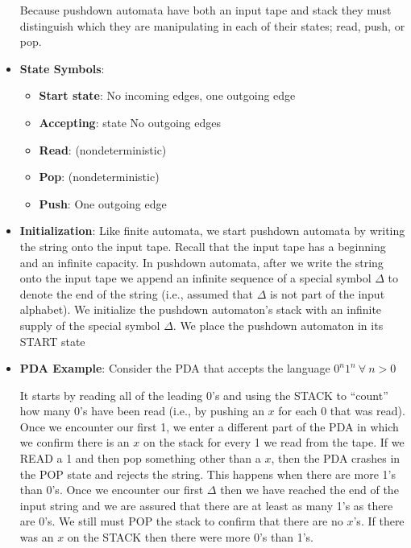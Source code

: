 \documentclass{report}
\begin{document}
\begin{itemize}
            \bigbreak \noindent 
            Because pushdown automata have both an input tape and stack they must distinguish which they are manipulating in each of their states; read, push, or pop.
            \pagebreak 
        \item \textbf{State Symbols}:
            \begin{itemize}
                \item \textbf{Start state}: No incoming edges, one outgoing edge
                \item \textbf{Accepting}: state No outgoing edges
                \item \textbf{Read}: (nondeterministic)
                \item \textbf{Pop}: (nondeterministic)
                \item \textbf{Push}: One outgoing edge
            \end{itemize}
            \bigbreak \noindent 
            \begin{figure}[ht]
                \centering
                \label{fig:pda1}
            \end{figure}
\item \textbf{Initialization}: Like finite automata, we start pushdown automata by writing the string onto the input tape. Recall that the input tape has a beginning and an infinite capacity.
    \bigbreak \noindent 
    In pushdown automata, after we write the string onto the input tape we append an infinite sequence of a special symbol $\Delta$ to denote the end of the string (i.e., assumed that $\Delta$ is not part of the input alphabet).
    \bigbreak \noindent 
    We initialize the pushdown automaton’s stack with an infinite supply of the special symbol $\Delta$.
    \bigbreak \noindent 
    We place the pushdown automaton in its START state
    \pagebreak 
\item \textbf{PDA Example}: Consider the PDA that accepts the language $0^{n}1^{n} \ \forall \ n >0 $
    \bigbreak \noindent 
    \begin{figure}[ht]
        \centering
        \label{fig:pda2}
    \end{figure}
    \bigbreak \noindent 
    It starts by reading all of the leading 0's and using the STACK to ``count'' how many 0's have been read (i.e., by pushing an $x$ for each 0 that was read).
    \bigbreak \noindent 
    Once we encounter our first 1, we enter a different part of the PDA in which we confirm there is an $x$ on the stack for every 1 we read from the tape.
    \bigbreak \noindent 
    If we READ a 1 and then pop something other than a $x$, then the PDA crashes in the POP state and rejects the string. This happens when there are more 1's than 0's.
    \bigbreak \noindent 
    Once we encounter our first $\Delta$ then we have reached the end of the input string and we are assured that there are at least as many 1's as there are 0's.
    \bigbreak \noindent 
    We still must POP the stack to confirm that there are no $x$'s. If there was an $x$ on the STACK then there were more 0's than 1's.

    \end{itemize}
\end{document}
